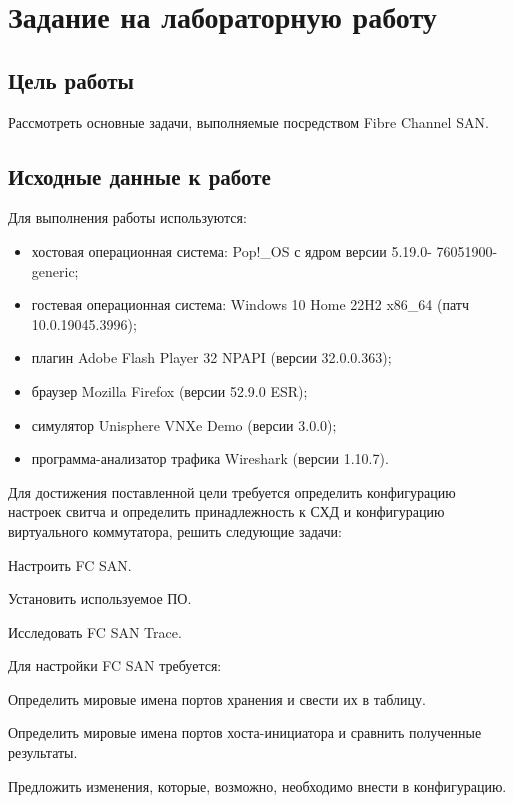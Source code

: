 \section{Задание на лабораторную работу}

\subsection{Цель работы}

Рассмотреть основные задачи, выполняемые посредством Fibre Channel SAN.

\subsection{Исходные данные к работе}

Для выполнения работы используются:

\begin{itemize}
    \item хостовая операционная система: Pop!\_OS с ядром версии 5.19.0-
          76051900-generic;
    \item гостевая операционная система: Windows 10 Home 22H2
          x86\_64 (патч 10.0.19045.3996);
    \item плагин Adobe Flash Player 32 NPAPI (версии 32.0.0.363);
    \item браузер Mozilla Firefox (версии 52.9.0 ESR);
    \item симулятор Unisphere VNXe Demo (версии 3.0.0);
    \item программа-анализатор трафика Wireshark (версии 1.10.7).
\end{itemize}

Для достижения поставленной цели требуется определить конфигурацию настроек
свитча и определить принадлежность к СХД и конфигурацию виртуального
коммутатора, решить следующие задачи:

\begin{enumerate_num}
    \item Настроить FC SAN.
    \item Установить используемое ПО.
    \item Исследовать FC SAN Trace.
\end{enumerate_num}

Для настройки FC SAN требуется:

\begin{enumerate_num}
    \item Определить мировые имена портов хранения и свести их в таблицу.
    \item Определить мировые имена портов хоста-инициатора и сравнить
    полученные результаты.
    \item Предложить изменения, которые, возможно, необходимо внести в
    конфигурацию.
\end{enumerate_num}

